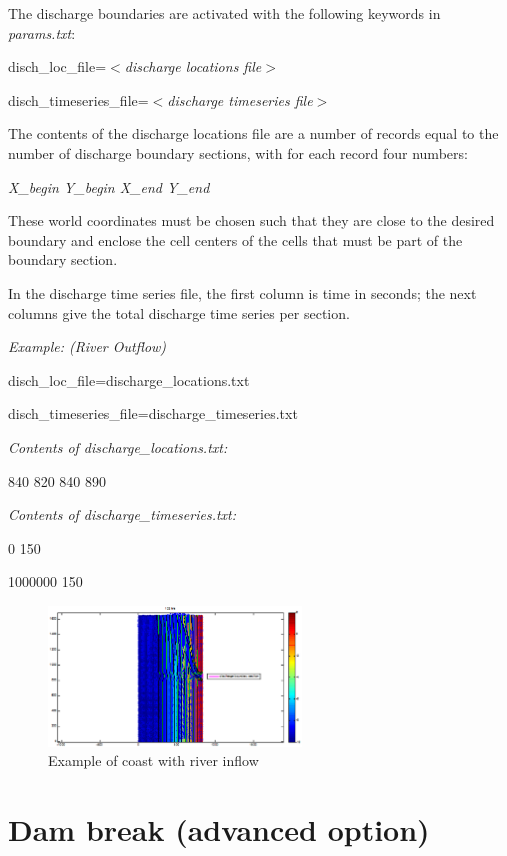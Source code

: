 The discharge boundaries are activated with the following keywords in \textit{params.txt}:

disch\_loc\_file=$<$\textit{discharge locations file}$>$

disch\_timeseries\_file=$<$\textit{discharge timeseries file$>$}

The contents of the discharge locations file are a number of records equal to the number of discharge boundary sections, with for each record four numbers:

\textit{X\_begin Y\_begin X\_end Y\_end}

\textit{}

These world coordinates must be chosen such that they are close to the desired boundary and enclose the cell centers of the cells that must be part of the boundary section.

In the discharge time series file, the first column is time in seconds; the next columns give the total discharge time series per section.

\textit{Example: (River Outflow)}

disch\_loc\_file=discharge\_locations.txt

disch\_timeseries\_file=discharge\_timeseries.txt

\textit{Contents of discharge\_locations.txt:}

840 820 840 890

\textit{Contents of discharge\_timeseries.txt:}

0 150

1000000 150

\textbf{}

\begin{figure}[h]
  \centering
  \includegraphics[width=0.6\textwidth]{image22}
  \caption{Example of coast with river inflow}
  \label{fig:image22}
\end{figure}

\section{ Dam break (advanced option)}

